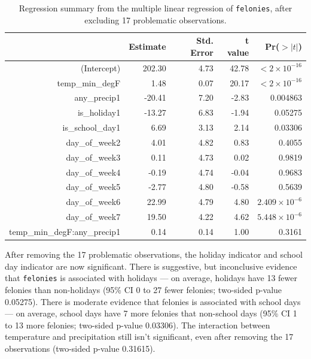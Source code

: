 \documentclass[11pt,notitlepage]{article}
\begin{document}
\begin{table}[ht]
\vspace*{-1mm}
\footnotesize
\centering
\begin{tabular}{rrrrr}
  \hline
 & Estimate & Std. Error & t value & Pr($>|t|$) \\ 
  \hline
(Intercept) & 202.30 & 4.73 & 42.78 & $<2 \times 10^{-16}$ \\ 
  temp\_min\_degF & 1.48 & 0.07 & 20.17 & $<2 \times 10^{-16}$ \\ 
  any\_precip1 & -20.41 & 7.20 & -2.83 & 0.004863 \\ 
  is\_holiday1 & -13.27 & 6.83 & -1.94 & 0.05275 \\ 
  is\_school\_day1 & 6.69 & 3.13 & 2.14 & 0.03306 \\ 
  day\_of\_week2 & 4.01 & 4.82 & 0.83 & 0.4055 \\ 
  day\_of\_week3 & 0.11 & 4.73 & 0.02 & 0.9819 \\ 
  day\_of\_week4 & -0.19 & 4.74 & -0.04 & 0.9683 \\ 
  day\_of\_week5 & -2.77 & 4.80 & -0.58 & 0.5639 \\ 
  day\_of\_week6 & 22.99 & 4.79 & 4.80 & $2.409 \times 10^{-6}$ \\ 
  day\_of\_week7 & 19.50 & 4.22 & 4.62 & $5.448 \times 10^{-6}$ \\ 
  temp\_min\_degF:any\_precip1 & 0.14 & 0.14 & 1.00 & 0.3161 \\ 
   \hline
\end{tabular}
\captionsetup{width=0.9\textwidth}
\vspace*{-2mm}
\caption{Regression summary from the multiple linear regression of \texttt{felonies}, after excluding 17 problematic observations.}
\label{tab:lm5}   
\vspace*{-3mm}
\end{table}





After removing the 17 problematic observations, the holiday indicator and school day indicator are now significant. There is suggestive, but inconclusive evidence that \texttt{felonies} is associated with holidays --- on average, holidays have 13 fewer felonies than non-holidays (95\% CI 0 to 27 fewer felonies; two-sided p-value 0.05275). There is moderate evidence that felonies is associated with school days --- on average, school days have 7 more felonies that non-school days (95\% CI 1 to 13 more felonies; two-sided p-value 0.03306). The interaction between temperature and precipitation still isn't significant, even after removing the 17 observations (two-sided p-value 0.31615).
\end{document}
